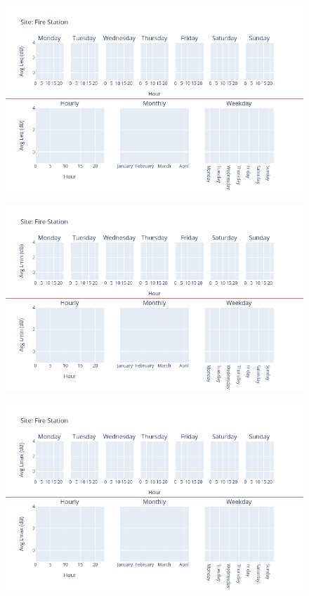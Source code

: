 \documentclass[12pt, oneside]{book}
\begin{document}
{ 
{\begin{figure}[H] 
 \centering 
\includegraphics[width=.88\textwidth, keepaspectratio]{image95} 
 \end{figure}}{} 

{\begin{figure}[H] 
 \centering 
\includegraphics[width=.88\textwidth, keepaspectratio]{image96} 
 \end{figure}}{} 

{\begin{figure}[H] 
 \centering 
\includegraphics[width=.88\textwidth, keepaspectratio]{image97} 
 \end{figure}}{} 

}
\end{document}
